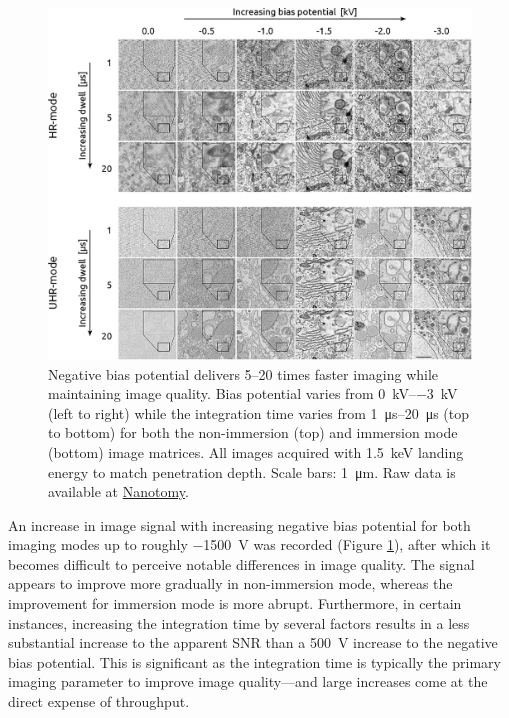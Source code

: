 \begin{figure}[!tb]
    \centering
    \includegraphics[width=\linewidth]{chapter-2/figures_JPEG_HQ/fig2-3_matrices.jpg}
    \caption{Negative bias potential delivers 5--20 times faster imaging while maintaining image quality. Bias potential varies from \SIrange[range-phrase=\text{ to }]{0}{-3}{\kilo\volt} (left to right) while the integration time varies from \SIrange[range-phrase=\text{ to }]{1}{20}{\micro\second} (top to bottom) for both the non-immersion (top) and immersion mode (bottom) image matrices. All images acquired with \SI{1.5}{\kilo\electronvolt} landing energy to match penetration depth. Scale bars: \SI{1}{\micro\meter}. Raw data is available at \href{www.nanotomy.org}{Nanotomy}.}
    \label{fig:2.3_matrices}
\end{figure}

An increase in image signal with increasing negative bias potential for both imaging modes up to roughly \SI{-1500}{\volt} was recorded (Figure \ref{fig:2.3_matrices}), after which it becomes difficult to perceive notable differences in image quality. The signal appears to improve more gradually in non-immersion mode, whereas the improvement for immersion mode is more abrupt. Furthermore, in certain instances, increasing the integration time by several factors results in a less substantial increase to the apparent SNR than a \SI{500}{\volt} increase to the negative bias potential. This is significant as the integration time is typically the primary imaging parameter to improve image quality—and large increases come at the direct expense of throughput.

